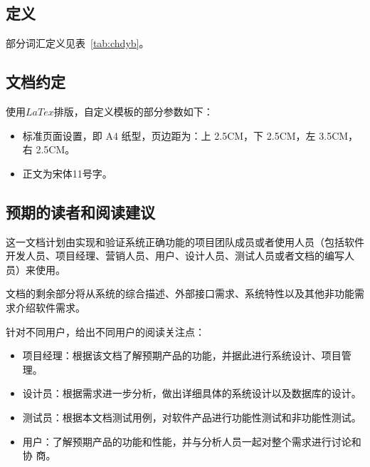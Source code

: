 \subsection{定义}
部分词汇定义见表~\ref{tab:chdyb}。
\begin{table}
\centering
{}
\caption{
词汇定义表
}
\label{tab:chdyb}
\end{table}

\subsection{文档约定}
使用$LaTex$排版，自定义模板的部分参数如下：

\begin{itemize}
\item 标准页面设置，即 A4 纸型，页边距为：上 2.5CM，下 2.5CM，左 3.5CM，右
2.5CM。
\item 正文为宋体11号字。
\end{itemize}

\subsection{预期的读者和阅读建议}
这一文档计划由实现和验证系统正确功能的项目团队成员或者使用人员（包括软件开发人员、项目经理、营销人员、用户、设计人员、测试人员或者文档的编写人员）来使用。

文档的剩余部分将从系统的综合描述、外部接口需求、系统特性以及其他非功能需求介绍软件需求。

针对不同用户，给出不同用户的阅读关注点：

\begin{itemize}
\item{项目经理：根据该文档了解预期产品的功能，并据此进行系统设计、项目管理。}
\item{设计员：根据需求进一步分析，做出详细具体的系统设计以及数据库的设计。}
\item{测试员：根据本文档测试用例，对软件产品进行功能性测试和非功能性测试。}
\item{用户：了解预期产品的功能和性能，并与分析人员一起对整个需求进行讨论和协
商。}
\end{itemize}

